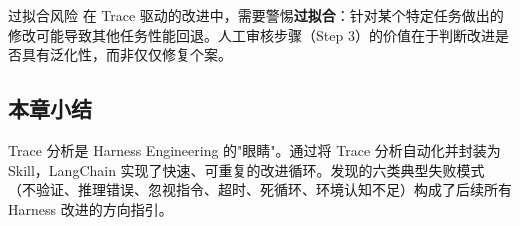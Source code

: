 \begin{warningbox}{过拟合风险}
在 Trace 驱动的改进中，需要警惕\textbf{过拟合}：针对某个特定任务做出的修改可能导致其他任务性能回退。人工审核步骤（Step 3）的价值在于判断改进是否具有泛化性，而非仅仅修复个案。
\end{warningbox}

\subsection{本章小结}

Trace 分析是 Harness Engineering 的"眼睛"。通过将 Trace 分析自动化并封装为 Skill，LangChain 实现了快速、可重复的改进循环。发现的六类典型失败模式（不验证、推理错误、忽视指令、超时、死循环、环境认知不足）构成了后续所有 Harness 改进的方向指引。


